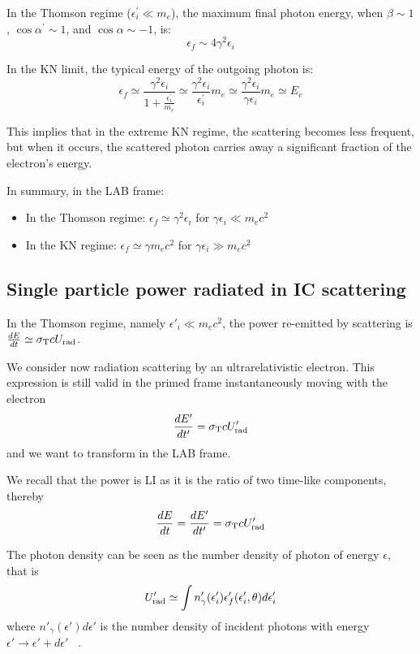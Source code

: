 In the Thomson regime (\( \epsilon^\prime_i \ll m_e \)), the maximum final photon energy, when \( \beta \sim 1 \), \( \cos \alpha^\prime \sim 1 \), and \( \cos \alpha \sim - 1 \), is:
%
\[
\epsilon_{f} \sim 4 \gamma^2 \epsilon_i
\]

In the KN limit, the typical energy of the outgoing photon is:
%
\[
\epsilon_f \simeq \frac{\gamma^2 \epsilon_i}{1 + \frac{\epsilon^\prime_i}{m_e}} \simeq \frac{\gamma^2 \epsilon_i}{\epsilon^\prime_i} m_e \simeq \frac{\gamma^2 \epsilon_i}{\gamma \epsilon_i} m_e \simeq E_e
\]

This implies that in the extreme KN regime, the scattering becomes less frequent, but when it occurs, the scattered photon carries away a significant fraction of the electron's energy.

\begin{remark}
In summary, in the LAB frame:
%
\begin{itemize}
\item In the Thomson regime: \( \epsilon_f \simeq \gamma^2 \epsilon_i \) for \( \gamma \epsilon_i \ll m_e c^2 \)
\item In the KN regime: \( \epsilon_f \simeq \gamma m_e c^2 \) for \( \gamma \epsilon_i \gg m_e c^2 \)
\end{itemize}
\end{remark}

\subsection{Single particle power radiated in IC scattering}

In the Thomson regime, namely $\epsilon'_i \ll m_e c^2$, the power re-emitted by scattering is $\frac{dE}{dt} \simeq \sigma_{\rm T} c U_{\rm rad}$.

We consider now radiation scattering by an ultrarelativistic electron. This expression is still valid in the primed frame instantaneously moving with the electron
%
\begin{equation*}
\frac{dE'}{dt'} = \sigma_{\rm T} c U'_{\rm rad}
\end{equation*}
%
and we want to transform in the LAB frame.

 We recall that the power is LI as it is the ratio of two time-like components, thereby
\begin{equation*}
 \frac{dE}{dt} = \frac{dE'}{dt'} = \sigma_{\rm T} c U'_{\rm rad}
\end{equation*}

The photon density can be seen as the number density of photon of energy $\epsilon$, that is
%
\begin{equation*}
U'_{\rm rad} \simeq 
\int n'_\gamma(\epsilon'_i) \epsilon'_f(\epsilon'_i, \theta) d\epsilon'_i
\end{equation*}
%
where $n'_\gamma(\epsilon') d\epsilon'$ is the number density of incident photons with energy $\epsilon' \rightarrow \epsilon' + d\epsilon'$ \, .

